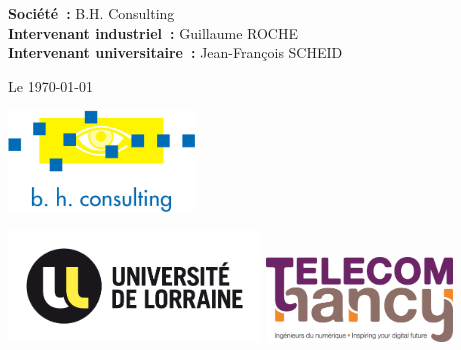 \documentclass[12pt]{article}
\begin{document}
\begin{center}
	{\Huge\textbf{\titreA}}

	\vspace{1cm}

	{\huge\emph{\titreB}}

	\vspace{1cm}

	\begin{flushleft}
		{\large
		\hspace{3.2cm}
		\textbf{Société~:} B.H. Consulting\\
		\hspace{3.2cm}
		\textbf{Intervenant industriel~:} Guillaume ROCHE\\
		\hspace{3.2cm}
		\textbf{Intervenant universitaire~:} Jean-François SCHEID
		}
	\end{flushleft}

	\vspace{1cm}
	{\large Le \today}

	\vspace{1.5cm}

	\includegraphics[width=140pt]{img/BHConsulting.jpg}

	\vspace{1.2cm}

	\includegraphics[width=190pt]{img/ul.png}
	\hspace{3.5cm}
	\includegraphics[width=140pt]{img/telecom-nancy.jpg}
\end{center}
\newpage

\thispagestyle{empty}
\tableofcontents
\newpage
\end{document}
